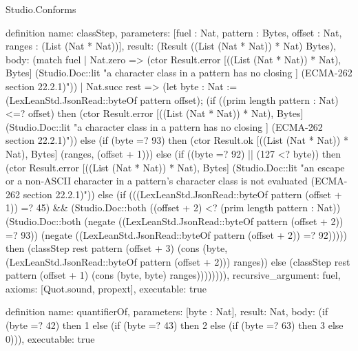 \begin{lexlean}{Studio.Conforms}
\begin{semanticmodule}
definition{
  name: classStep,
  parameters: [fuel : Nat, pattern : Bytes, offset : Nat, ranges : (List (Nat * Nat))],
  result: (Result ((List (Nat * Nat)) * Nat) Bytes),
  body: (match fuel
    | Nat.zero => (ctor Result.error [((List (Nat * Nat)) * Nat), Bytes] (Studio.Doc::lit "a character class in a pattern has no closing ] (ECMA-262 section 22.2.1)"))
    | Nat.succ rest => (let byte : Nat := (LexLeanStd.JsonRead::byteOf pattern offset); (if ((prim length pattern : Nat) <=? offset) then (ctor Result.error [((List (Nat * Nat)) * Nat), Bytes] (Studio.Doc::lit "a character class in a pattern has no closing ] (ECMA-262 section 22.2.1)")) else (if (byte =? 93) then (ctor Result.ok [((List (Nat * Nat)) * Nat), Bytes] (ranges, (offset + 1))) else (if ((byte =? 92) || (127 <? byte)) then (ctor Result.error [((List (Nat * Nat)) * Nat), Bytes] (Studio.Doc::lit "an escape or a non-ASCII character in a pattern's character class is not evaluated (ECMA-262 section 22.2.1)")) else (if (((LexLeanStd.JsonRead::byteOf pattern (offset + 1)) =? 45) && (Studio.Doc::both ((offset + 2) <? (prim length pattern : Nat)) (Studio.Doc::both (negate ((LexLeanStd.JsonRead::byteOf pattern (offset + 2)) =? 93)) (negate ((LexLeanStd.JsonRead::byteOf pattern (offset + 2)) =? 92))))) then (classStep rest pattern (offset + 3) (cons (byte, (LexLeanStd.JsonRead::byteOf pattern (offset + 2))) ranges)) else (classStep rest pattern (offset + 1) (cons (byte, byte) ranges)))))))),
  recursive_argument: fuel,
  axioms: [Quot.sound, propext],
  executable: true
}

definition{
  name: quantifierOf,
  parameters: [byte : Nat],
  result: Nat,
  body: (if (byte =? 42) then 1 else (if (byte =? 43) then 2 else (if (byte =? 63) then 3 else 0))),
  executable: true
}


\end{semanticmodule}
\end{lexlean}
